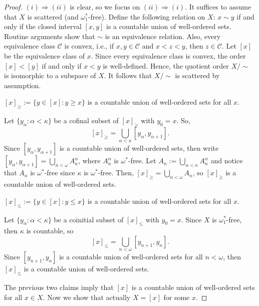 \begin{proof}
    $(i)\Rightarrow(ii)$ is clear, so we focus on $(ii)\Rightarrow(i)$.
    It suffices to assume that $X$ is scattered (and $\omega_1^*$-free).
    Define the following relation on $X$: $x\sim y$ if and only if the closed interval $[x,y]$ is a countable union of well-ordered sets.
    Routine arguments show that $\sim$ is an equivalence relation.
    Also, every equivalence class $\mathcal{C}$ is convex, i.e., if $x,y\in\mathcal{C}$ and $x<z<y$, then $z\in\mathcal{C}$.
    Let $[x]$ be the equivalence class of $x$.
    Since every equivalence class is convex, the order $[x]<[y]$ if and only if $x<y$ is well-defined.
    Hence, the quotient order $X/\!\sim$ is isomorphic to a subspace of $X$.
    It follows that $X/\!\sim$ is scattered by assumption.
    \begin{claim}
        $[x]_{\geq}:=\{y\in[x]:y\geq x\}$ is a countable union of well-ordered sets for all $x$.
    \end{claim}
    \begin{claimproof}
        Let $\{y_\alpha:\alpha<\kappa\}$ be a cofinal subset of $[x]_{\geq}$ with $y_0=x$.
        So, $$[x]_{\geq}=\bigcup_{\alpha<\kappa}[y_\alpha, y_{\alpha+1}].$$
        Since $[y_\alpha, y_{\alpha+1}]$ is a countable union of well-ordered sets, then write $[y_\alpha, y_{\alpha+1}]=\bigcup_{n<\omega}A_n^\alpha$, where $A_n^\alpha$ is $\omega^*$-free.
        Let $A_n:=\bigcup_{\alpha<\kappa}A_n^\alpha$ and notice that $A_n$ is $\omega^*$-free since $\kappa$ is $\omega^*$-free.
        Then, $[x]_\geq=\bigcup_{n<\omega}A_n$, so $[x]_\geq$ is a countable union of well-ordered sets.
    \end{claimproof}
    \begin{claim}
        $[x]_{\leq}:=\{y\in[x]:y\leq x\}$ is a countable union of well-ordered sets for all $x$.
    \end{claim}
    \begin{claimproof}
        Let $\{y_\alpha:\alpha<\kappa\}$ be a coinitial subset of $[x]_\leq$ with $y_0=x$.
        Since $X$ is $\omega_1^*$-free, then $\kappa$ is countable, so
        $$[x]_\leq=\bigcup_{n<\omega}[y_{n+1},y_n].$$
        Since $[y_{n+1},y_n]$ is a countable union of well-ordered sets for all $n<\omega$, then $[x]_{\leq}$ is a countable union of well-ordered sets.
    \end{claimproof}
    The previous two claims imply that $[x]$ is a countable union of well-ordered sets for all $x\in X$.
    Now we show that actually $X=[x]$ for some $x$.

\end{proof}

